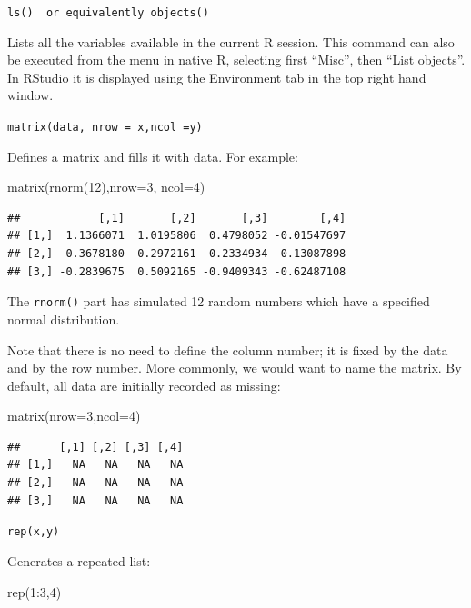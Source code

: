 \documentclass[
]{book}
\newenvironment{Shaded}{\begin{snugshade}}{\end{snugshade}}
\newcommand{\AttributeTok}[1]{\textcolor[rgb]{0.77,0.63,0.00}{#1}}
\newcommand{\DecValTok}[1]{\textcolor[rgb]{0.00,0.00,0.81}{#1}}
\newcommand{\FunctionTok}[1]{\textcolor[rgb]{0.00,0.00,0.00}{#1}}
\newcommand{\NormalTok}[1]{#1}
\newcommand{\SpecialCharTok}[1]{\textcolor[rgb]{0.00,0.00,0.00}{#1}}
\begin{document}
\texttt{ls()\ \ or\ equivalently\ objects()}

Lists all the variables available in the current R session. This command can also be executed from the menu in native R, selecting first ``Misc'', then ``List objects''. In RStudio it is displayed using the Environment tab in the top right hand window.

\texttt{matrix(data,\ nrow\ =\ x,ncol\ =y)}

Defines a matrix and fills it with data. For example:

\begin{Shaded}
\begin{Highlighting}[]
\FunctionTok{matrix}\NormalTok{(}\FunctionTok{rnorm}\NormalTok{(}\DecValTok{12}\NormalTok{),}\AttributeTok{nrow=}\DecValTok{3}\NormalTok{, }\AttributeTok{ncol=}\DecValTok{4}\NormalTok{)}
\end{Highlighting}
\end{Shaded}

\begin{verbatim}
##            [,1]       [,2]       [,3]        [,4]
## [1,]  1.1366071  1.0195806  0.4798052 -0.01547697
## [2,]  0.3678180 -0.2972161  0.2334934  0.13087898
## [3,] -0.2839675  0.5092165 -0.9409343 -0.62487108
\end{verbatim}

The \texttt{rnorm()} part has simulated 12 random numbers which have a specified normal distribution.

Note that there is no need to define the column number; it is fixed by the data and by the row number. More commonly, we would want to name the matrix. By default, all data are initially recorded as missing:

\begin{Shaded}
\begin{Highlighting}[]
\FunctionTok{matrix}\NormalTok{(}\AttributeTok{nrow=}\DecValTok{3}\NormalTok{,}\AttributeTok{ncol=}\DecValTok{4}\NormalTok{)}
\end{Highlighting}
\end{Shaded}

\begin{verbatim}
##      [,1] [,2] [,3] [,4]
## [1,]   NA   NA   NA   NA
## [2,]   NA   NA   NA   NA
## [3,]   NA   NA   NA   NA
\end{verbatim}

\texttt{rep(x,y)}

Generates a repeated list:

\begin{Shaded}
\begin{Highlighting}[]
\FunctionTok{rep}\NormalTok{(}\DecValTok{1}\SpecialCharTok{:}\DecValTok{3}\NormalTok{,}\DecValTok{4}\NormalTok{)}
\end{Highlighting}
\end{Shaded}
\end{document}
